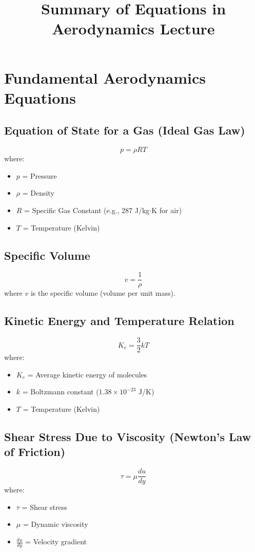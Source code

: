 \documentclass{article}
\begin{document}
\title{Summary of Equations in Aerodynamics Lecture}
\author{}
\date{}
\maketitle

\section{Fundamental Aerodynamics Equations}

\subsection{Equation of State for a Gas (Ideal Gas Law)}
\begin{equation}
    p = \rho R T
\end{equation}
where:
\begin{itemize}
    \item $p$ = Pressure
    \item $\rho$ = Density
    \item $R$ = Specific Gas Constant (e.g., 287 J/kg$\cdot$K for air)
    \item $T$ = Temperature (Kelvin)
\end{itemize}

\subsection{Specific Volume}
\begin{equation}
    v = \frac{1}{\rho}
\end{equation}
where $v$ is the specific volume (volume per unit mass).

\subsection{Kinetic Energy and Temperature Relation}
\begin{equation}
    K_e = \frac{3}{2} k T
\end{equation}
where:
\begin{itemize}
    \item $K_e$ = Average kinetic energy of molecules
    \item $k$ = Boltzmann constant ($1.38 \times 10^{-23}$ J/K)
    \item $T$ = Temperature (Kelvin)
\end{itemize}

\subsection{Shear Stress Due to Viscosity (Newton’s Law of Friction)}
\begin{equation}
    \tau = \mu \frac{du}{dy}
\end{equation}
where:
\begin{itemize}
    \item $\tau$ = Shear stress
    \item $\mu$ = Dynamic viscosity
    \item $\frac{du}{dy}$ = Velocity gradient
\end{itemize}
\end{document}
